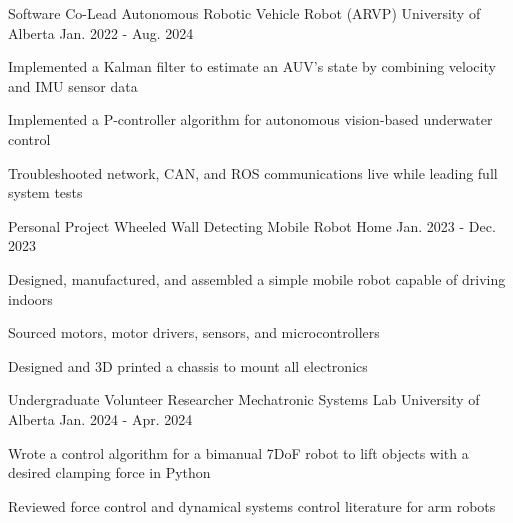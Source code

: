 \begin{cventries}
\cventry
    {Software Co-Lead} %
    {Autonomous Robotic Vehicle Robot (ARVP)} %
    {University of Alberta} %
    {Jan. 2022 - Aug. 2024} %
    {
    \begin{cvitems} %
      \item Implemented a Kalman filter to estimate an AUV's state by combining velocity and IMU sensor data 
      \item Implemented a P-controller algorithm for autonomous vision-based underwater control
      \item Troubleshooted network, CAN, and ROS communications live while leading full system tests 
    \end{cvitems}
    }
  \cventry
      {Personal Project} %
      {Wheeled Wall Detecting Mobile Robot} %
      {Home} %
      {Jan. 2023 - Dec. 2023} %
      {
      \begin{cvitems} %
        \item Designed, manufactured, and assembled a simple mobile robot capable of driving indoors 
        \item Sourced motors, motor drivers, sensors, and microcontrollers
        \item Designed and 3D printed a chassis to mount all electronics
      \end{cvitems}
      }
      \vspace{1.5mm}  %
  
\cventry
    {Undergraduate Volunteer Researcher} %
    {Mechatronic Systems Lab} %
    {University of Alberta} %
    {Jan. 2024 - Apr. 2024} %
    {
      \begin{cvitems} %
        \item Wrote a control algorithm for a bimanual 7DoF robot to lift objects with a desired clamping force in Python
        \item Reviewed force control and dynamical systems control literature for arm robots
      \end{cvitems}
    }
  

\end{cventries}
